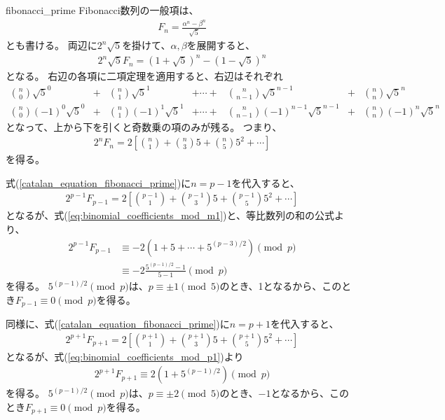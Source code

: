\begin{thProof}{fibonacci_prime}
Fibonacci数列の一般項は、
\begin{align*}
F_n = \frac{\alpha^n - \beta^n}{\sqrt{5}}
\end{align*}
とも書ける。
両辺に$2^n\sqrt{5}$を掛けて、$\alpha,\beta$を展開すると、
\begin{align*}
2^n\sqrt{5}F_n = (1+\sqrt{5})^n - (1-\sqrt{5})^n
\end{align*}
となる。
右辺の各項に二項定理を適用すると、右辺はそれぞれ
\begin{align*}
{n \choose 0}\sqrt{5}^0       &+& {n \choose 1}\sqrt{5}^1       &+ \cdots +& {n \choose n-1}\sqrt{5}^{n-1}           &+& {n \choose n}\sqrt{5}^n\\
{n \choose 0}(-1)^0\sqrt{5}^0 &+& {n \choose 1}(-1)^1\sqrt{5}^1 &+ \cdots +& {n \choose n-1}(-1)^{n-1}\sqrt{5}^{n-1} &+& {n \choose n}(-1)^n\sqrt{5}^n
\end{align*}
となって、上から下を引くと奇数乗の項のみが残る。
つまり、
\begin{align}
\label{catalan_equation_fibonacci_prime}
2^n F_n = 2 \left[ {n \choose 1} + {n \choose 3}5 + {n \choose 5}5^2 + \cdots \right]
\end{align}
を得る。

式(\ref{catalan_equation_fibonacci_prime})に$n=p-1$を代入すると、
\begin{align*}
2^{p-1}F_{p-1} = 2 \left[ {p-1 \choose 1} + {p-1 \choose 3}5 + {p-1 \choose 5}5^2 + \cdots \right]
\end{align*}
となるが、式(\ref{eq:binomial_coefficients_mod_m1})と、等比数列の和の公式より、
\begin{align*}
2^{p-1}F_{p-1} &\equiv -2 (1 + 5 + \cdots + 5^{(p-3)/2}) \pmod{p}\\
&\equiv -2 \frac{5^{(p-1)/2} - 1}{5-1}\pmod{p}
\end{align*}
を得る。
$5^{(p-1)/2}\pmod{p}$は、$p\equiv\pm1\pmod{5}$のとき、1となるから、このとき$F_{p-1}\equiv 0\pmod{p}$を得る。

同様に、式(\ref{catalan_equation_fibonacci_prime})に$n=p+1$を代入すると、
\begin{align*}
2^{p+1}F_{p+1} = 2 \left[ {p+1 \choose 1} + {p+1 \choose 3}5 + {p+1 \choose 5}5^2 + \cdots \right]
\end{align*}
となるが、式(\ref{eq:binomial_coefficients_mod_p1})より
\begin{align*}
2^{p+1}F_{p+1} \equiv 2 (1 + 5^{(p-1)/2}) \pmod{p}
\end{align*}
を得る。
$5^{(p-1)/2}\pmod{p}$は、$p\equiv\pm2\pmod{5}$のとき、$-1$となるから、このとき$F_{p+1}\equiv 0\pmod{p}$を得る。
\end{thProof}

